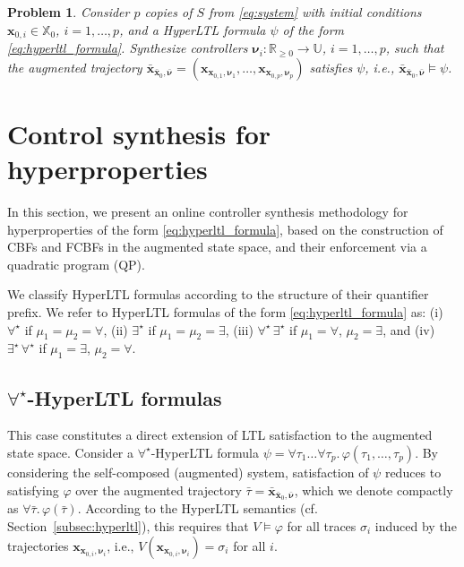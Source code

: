 \documentclass[letterpaper, 10 pt, conference]{ieeeconf}  %
\newtheorem{problem}{Problem}
\begin{document}
\begin{problem} \label{pr:HyperLTL}
    Consider $p$ copies of $S$ from \eqref{eq:system} with initial conditions $\mathbf{x}_{0, i} \in \mathbb{X}_0$, $i = 1, \dots, p$, and a HyperLTL formula $\psi$ of the form \eqref{eq:hyperltl_formula}. Synthesize controllers $\boldsymbol{\nu}_i: \mathbb{R}_{\ge 0} \rightarrow \mathbb{U}$, $i = 1, \dots, p$, such that the augmented trajectory $\bar{\mathbf{x}}_{\bar{\mathbf{x}}_0, \bar{\boldsymbol{\nu}}} = (\mathbf{x}_{\mathbf{x}_{0, 1}, \boldsymbol{\nu}_1}, \dots, \mathbf{x}_{\mathbf{x}_{0, p}, \boldsymbol{\nu}_p})$ satisfies $\psi$, i.e., $\bar{\mathbf{x}}_{\bar{\mathbf{x}}_0, \bar{\boldsymbol{\nu}}} \models \psi$. 
\end{problem}

\section{Control synthesis for hyperproperties} \label{sec:control_synthesis}

In this section, we present an online controller synthesis methodology for hyperproperties of the form \eqref{eq:hyperltl_formula}, based on the construction of CBFs and FCBFs in the augmented state space, and their enforcement via a quadratic program (QP). 

We classify HyperLTL formulas according to the structure of their quantifier prefix. We refer to HyperLTL formulas of the form \eqref{eq:hyperltl_formula} as: (i) $\forall^\star$ if $\mu_1 = \mu_2 = \forall$, (ii) $\exists^\star$ if $\mu_1 = \mu_2 = \exists$, (iii) $\forall^\star \, \exists^\star$ if $\mu_1 = \forall$, $\mu_2 = \exists$, and (iv) $\exists^\star \, \forall^\star$ if $\mu_1 = \exists$, $\mu_2 = \forall$.

\subsection{$\forall^\star$-HyperLTL formulas} \label{subsec:forall}

This case constitutes a direct extension of LTL satisfaction to the augmented state space. Consider a $\forall^\star$-HyperLTL formula $\psi = \forall \tau_1 \dots \forall \tau_p. \, \varphi(\tau_1, \dots, \tau_p)$. By considering the self-composed (augmented) system, satisfaction of $\psi$ reduces to satisfying $\varphi$ over the augmented trajectory $\bar{\tau} = \bar{\mathbf{x}}_{\bar{\mathbf{x}}_0, \bar{\boldsymbol{\nu}}}$, which we denote compactly as $\forall \bar{\tau}. \, \varphi(\bar{\tau})$. According to the HyperLTL semantics (cf. Section~\ref{subsec:hyperltl}), this requires that $V \models \varphi$ for all traces $\sigma_i$ induced by the trajectories $\mathbf{x}_{\mathbf{x}_{0, i}, \boldsymbol{\nu}_i}$, i.e., $V(\mathbf{x}_{\mathbf{x}_{0, i}, \boldsymbol{\nu}_i}) = \sigma_i$ for all $i$.
\end{document}
